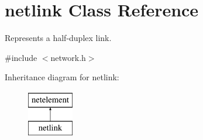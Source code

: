 \hypertarget{classnetlink}{\section{netlink Class Reference}
\label{classnetlink}
}


Represents a half-\/duplex link.  




{\ttfamily \#include $<$network.\-h$>$}

Inheritance diagram for netlink\-:\begin{figure}[H]
\begin{center}
\leavevmode
\includegraphics[height=2.000000cm]{classnetlink}
\end{center}
\end{figure}

